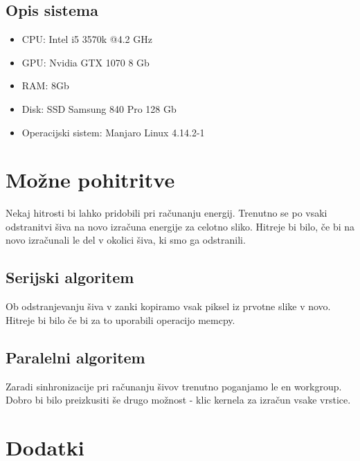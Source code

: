 \documentclass[11pt,a4paper]{article}
\begin{document}
\subsection{Opis sistema}
\begin{itemize}
\item CPU: Intel i5 3570k @4.2 GHz
\item GPU: Nvidia GTX 1070 8 Gb
\item RAM: 8Gb
\item Disk: SSD Samsung 840 Pro 128 Gb
\item Operacijski sistem: Manjaro Linux 4.14.2-1
\end{itemize}

\section{Možne pohitritve}
Nekaj hitrosti bi lahko pridobili pri računanju energij.
Trenutno se po vsaki odstranitvi šiva na novo izračuna
energije za celotno sliko. Hitreje bi bilo, če bi na 
novo izračunali le del v okolici šiva, ki smo ga odstranili.



\subsection{Serijski algoritem}
Ob odstranjevanju šiva v zanki kopiramo vsak piksel iz prvotne
slike v novo. Hitreje bi bilo če bi za to uporabili operacijo
memcpy.

\subsection{Paralelni algoritem}
Zaradi sinhronizacije pri računanju šivov trenutno poganjamo
le en workgroup. Dobro bi bilo preizkusiti še drugo možnost - 
klic kernela za izračun vsake vrstice.

\pagebreak

\section{Dodatki}
\end{document}
